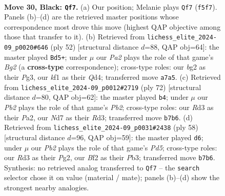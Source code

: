\documentclass[11pt]{article}
\begin{document}
\clearpage

\begin{figure}[p]\centering
\begin{subfigure}{0.46\textwidth}\centering
\resizebox{\linewidth}{!}{%
\newchessgame
\chessboard[
  setfen={2Q5/pp1n2kp/7p/1P3q2/3P4/3r4/4NbB1/R4K1R b - - 7 30},
  showmover=false,
  pgfstyle=straightmove, color=movearrow, markmove={f5-f7}
]}
\caption{}
\end{subfigure}\hfill
\begin{subfigure}{0.46\textwidth}\centering
\resizebox{\linewidth}{!}{%
\newchessgame
\chessboard[
  setfen={2r3k1/pp5p/5qpB/4N3/2bQ4/6PP/P4PB1/6K1 w - - 5 27},
  showmover=false,
  pgfstyle=straightmove, color=movearrow, markmove={g2-d5}
]}
\caption{}
\end{subfigure}
\\[4pt]
\begin{subfigure}{0.46\textwidth}\centering
\resizebox{\linewidth}{!}{%
\newchessgame
\chessboard[
  setfen={5rk1/Q6p/4p1p1/1qN3r1/3p4/3R1P2/PP3P1P/5K2 w - - 3 37},
  showmover=false,
  pgfstyle=straightmove, color=movearrow, markmove={b2-b4}
]}
\caption{}
\end{subfigure}\hfill
\begin{subfigure}{0.46\textwidth}\centering
\resizebox{\linewidth}{!}{%
\newchessgame
\chessboard[
  setfen={4r1k1/3qB1bp/6p1/2pP4/4Q3/1P5P/5PP1/6K1 w - - 3 30},
  showmover=false,
  pgfstyle=straightmove, color=movearrow, markmove={d5-d6}
]}
\caption{}
\end{subfigure}
\caption{\textbf{Move 30, Black: \texttt{Qf7}.} (a) Our position; Melanie plays \texttt{Qf7} (\texttt{f5f7}). Panels (b)--(d) are the retrieved master positions whose correspondence most drove this move (highest QAP objective among those that transfer to it). (b) Retrieved from \texttt{lichess\_elite\_2024-09\_p0020\#646} (ply 52) [structural distance $d$=88, QAP obj=64]: the master played \texttt{Bd5+}; under $\mu$ our \emph{Pa2} plays the role of that game's \emph{Bg2} (a \textbf{cross-type} correspondence); cross-type roles: our \emph{b}g2 as their \emph{P}g3, our \emph{k}f1 as their \emph{Q}d4; transferred move \texttt{a7a5}. (c) Retrieved from \texttt{lichess\_elite\_2024-09\_p0012\#2719} (ply 72) [structural distance $d$=80, QAP obj=62]: the master played \texttt{b4}; under $\mu$ our \emph{Pb2} plays the role of that game's \emph{Pb2}; cross-type roles: our \emph{R}d3 as their \emph{P}a2, our \emph{N}d7 as their \emph{R}d3; transferred move \texttt{b7b6}. (d) Retrieved from \texttt{lichess\_elite\_2024-09\_p0031\#2438} (ply 58) [structural distance $d$=96, QAP obj=59]: the master played \texttt{d6}; under $\mu$ our \emph{Pb2} plays the role of that game's \emph{Pd5}; cross-type roles: our \emph{R}d3 as their \emph{P}g2, our \emph{B}f2 as their \emph{P}b3; transferred move \texttt{b7b6}. Synthesis: no retrieved analog transferred to \texttt{Qf7} -- the \texttt{search} selector chose it on value (material / mate); panels (b)--(d) show the strongest nearby analogies.}
\label{fig:thought-m59}
\end{figure}
\end{document}
